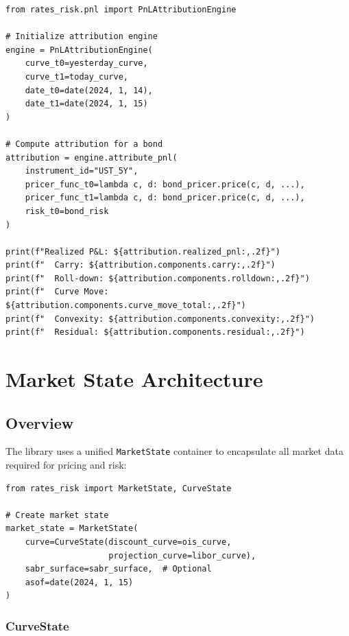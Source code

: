 \documentclass[12pt,a4paper]{report}
\newcommand{\code}[1]{\texttt{#1}}
\begin{document}
\begin{lstlisting}
from rates_risk.pnl import PnLAttributionEngine

# Initialize attribution engine
engine = PnLAttributionEngine(
    curve_t0=yesterday_curve,
    curve_t1=today_curve,
    date_t0=date(2024, 1, 14),
    date_t1=date(2024, 1, 15)
)

# Compute attribution for a bond
attribution = engine.attribute_pnl(
    instrument_id="UST_5Y",
    pricer_func_t0=lambda c, d: bond_pricer.price(c, d, ...),
    pricer_func_t1=lambda c, d: bond_pricer.price(c, d, ...),
    risk_t0=bond_risk
)

print(f"Realized P&L: ${attribution.realized_pnl:,.2f}")
print(f"  Carry: ${attribution.components.carry:,.2f}")
print(f"  Roll-down: ${attribution.components.rolldown:,.2f}")
print(f"  Curve Move: ${attribution.components.curve_move_total:,.2f}")
print(f"  Convexity: ${attribution.components.convexity:,.2f}")
print(f"  Residual: ${attribution.components.residual:,.2f}")
\end{lstlisting}

\chapter{Market State Architecture}

\section{Overview}

The library uses a unified \code{MarketState} container to encapsulate all market data required for pricing and risk:

\begin{lstlisting}
from rates_risk import MarketState, CurveState

# Create market state
market_state = MarketState(
    curve=CurveState(discount_curve=ois_curve,
                     projection_curve=libor_curve),
    sabr_surface=sabr_surface,  # Optional
    asof=date(2024, 1, 15)
)
\end{lstlisting}

\subsection{CurveState}
\end{document}

